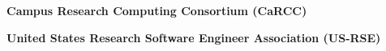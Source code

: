 \documentclass{acmcv}
\begin{document}
    \textbf{Campus Research Computing Consortium (CaRCC)}

    \textbf{United States Research Software Engineer Association (US-RSE)}










    






     
\end{document}
